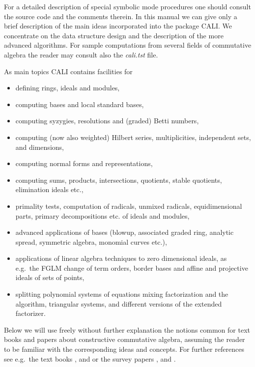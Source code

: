 For a detailed description of special symbolic mode procedures one
should consult the source code and the comments therein. In this
manual we can give only a brief description of the main ideas
incorporated into the package CALI. We concentrate on the data
structure design and the description of the more advanced algorithms.
For sample computations from several fields of commutative algebra
the reader may consult also the {\em cali.tst} file.
\medskip

As main topics CALI contains facilities for
\begin{itemize}
\item defining rings, ideals and modules,

\item computing \gr bases and local standard bases,

\item computing syzygies, resolutions and (graded) Betti numbers,

\item computing (now also weighted) Hilbert series, multiplicities,
independent sets, and dimensions,

\item computing normal forms and representations,

\item computing sums, products, intersections, quotients, stable
quotients, elimination ideals etc.,

\item primality tests, computation of radicals, unmixed radicals,
equidimensional parts, primary decompositions etc. of ideals and
modules,

\item advanced applications of \gr bases (blowup, associated graded
ring, analytic spread, symmetric algebra, monomial curves etc.),

\item applications of linear algebra techniques to zero dimensional
        ideals, as e.g.\ the FGLM change of term orders, border bases
        and affine and projective ideals of sets of points,

\item splitting polynomial systems of equations mixing factorization and
the \gr algorithm, triangular systems, and different versions of the
extended \gr factorizer.

\end{itemize}

Below we will use freely without further explanation the notions
common for text books and papers about constructive commutative
algebra, assuming the reader to be familiar with the corresponding
ideas and concepts. For further references see e.g.\ the text books
\cite{BKW}, \cite{CLO} and \cite{Mishra} or the survey papers
\cite{B1}, \cite{B2} and \cite{Ro}.

